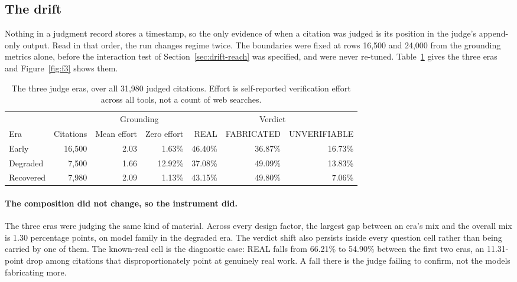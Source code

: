 \subsection{The drift}


Nothing in a judgment record stores a timestamp, so the only evidence of when a
citation was judged is its position in the judge's append-only output. Read in
that order, the run changes regime twice. The boundaries were fixed at rows
16,500 and 24,000 from the grounding metrics alone, before the interaction test
of Section~\ref{sec:drift-reach} was specified, and were never re-tuned.
Table~\ref{tab:eras} gives the three eras and Figure~\ref{fig:f3} shows them.

\begin{table}[t]
\centering
\caption{The three judge eras, over all 31,980 judged citations. Effort is
self-reported verification effort across all tools, not a count of web searches.}
\label{tab:eras}
\begin{tabular}{lrrrrrr}
\toprule
& & \multicolumn{2}{c}{Grounding} & \multicolumn{3}{c}{Verdict} \\
\cmidrule(lr){3-4}\cmidrule(lr){5-7}
Era & Citations & Mean effort & Zero effort & REAL & FABRICATED & UNVERIFIABLE \\
\midrule
Early     & 16{,}500 & 2.03 & 1.63\%  & 46.40\% & 36.87\% & 16.73\% \\
Degraded  &  7{,}500 & 1.66 & 12.92\% & 37.08\% & 49.09\% & 13.83\% \\
Recovered &  7{,}980 & 2.09 & 1.13\%  & 43.15\% & 49.80\% &  7.06\% \\
\bottomrule
\end{tabular}
\end{table}

\paragraph{The composition did not change, so the instrument did.}
The three eras were judging the same kind of material. Across every design
factor, the largest gap between an era's mix and the overall mix is 1.30
percentage points, on model family in the degraded era. The verdict shift also
persists inside every question cell rather than being carried by one of them.
The known-real cell is the diagnostic case: REAL falls from 66.21\% to 54.90\%
between the first two eras, an 11.31-point drop among citations that
disproportionately point at genuinely real work. A fall there is the judge
failing to confirm, not the models fabricating more.

